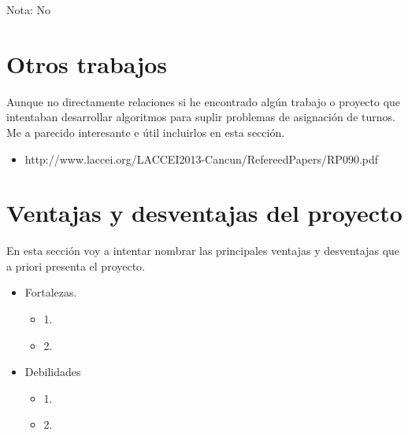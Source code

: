 Nota: No

\section{Otros trabajos}
Aunque no directamente relaciones si he encontrado algún trabajo o proyecto que intentaban desarrollar algoritmos para suplir problemas de asignación de turnos. Me a parecido interesante e útil incluirlos en esta sección.
     \begin{itemize}
         \item http://www.laccei.org/LACCEI2013-Cancun/RefereedPapers/RP090.pdf
    \end{itemize}

\section{Ventajas y desventajas del proyecto}

En esta sección voy a intentar nombrar las principales ventajas y desventajas que a priori presenta el proyecto.


\begin{itemize}
    \item Fortalezas.
     \begin{itemize}
         \item 1.
         \item 2.
    \end{itemize}
    \item Debilidades
    \begin{itemize}
         \item 1.
         \item 2.
    \end{itemize}
\end{itemize}